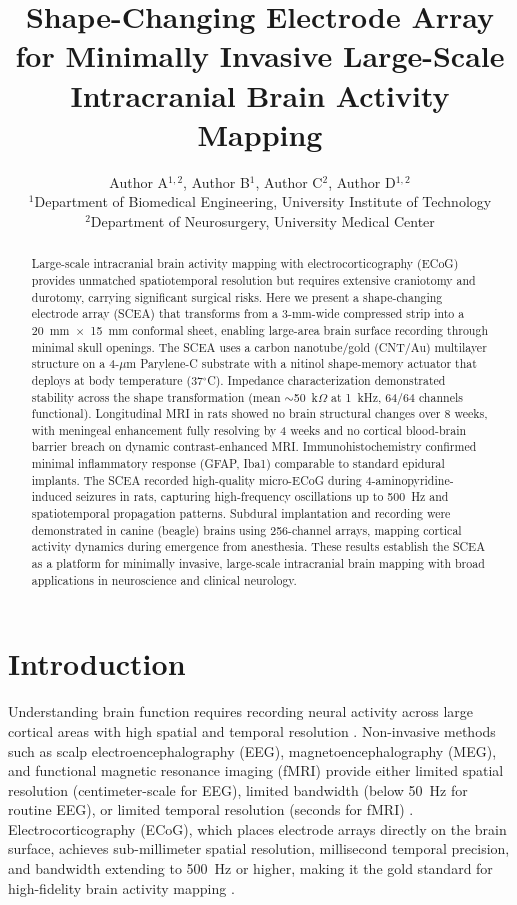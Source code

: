 \documentclass[11pt]{article}
\title{Shape-Changing Electrode Array for Minimally Invasive Large-Scale Intracranial Brain Activity Mapping}
\author{Author A$^{1,2}$, Author B$^{1}$, Author C$^{2}$, Author D$^{1,2}$ \\
\small $^{1}$Department of Biomedical Engineering, University Institute of Technology \\
\small $^{2}$Department of Neurosurgery, University Medical Center}
\date{}
\begin{document}
\maketitle

\begin{abstract}
Large-scale intracranial brain activity mapping with electrocorticography (ECoG) provides unmatched spatiotemporal resolution but requires extensive craniotomy and durotomy, carrying significant surgical risks. Here we present a shape-changing electrode array (SCEA) that transforms from a 3-mm-wide compressed strip into a 20~mm~$\times$~15~mm conformal sheet, enabling large-area brain surface recording through minimal skull openings. The SCEA uses a carbon nanotube/gold (CNT/Au) multilayer structure on a 4-$\mu$m Parylene-C substrate with a nitinol shape-memory actuator that deploys at body temperature (37$^{\circ}$C). Impedance characterization demonstrated stability across the shape transformation (mean $\sim$50~k$\Omega$ at 1~kHz, 64/64 channels functional). Longitudinal MRI in rats showed no brain structural changes over 8 weeks, with meningeal enhancement fully resolving by 4 weeks and no cortical blood-brain barrier breach on dynamic contrast-enhanced MRI. Immunohistochemistry confirmed minimal inflammatory response (GFAP, Iba1) comparable to standard epidural implants. The SCEA recorded high-quality micro-ECoG during 4-aminopyridine-induced seizures in rats, capturing high-frequency oscillations up to 500~Hz and spatiotemporal propagation patterns. Subdural implantation and recording were demonstrated in canine (beagle) brains using 256-channel arrays, mapping cortical activity dynamics during emergence from anesthesia. These results establish the SCEA as a platform for minimally invasive, large-scale intracranial brain mapping with broad applications in neuroscience and clinical neurology.
\end{abstract}

\section{Introduction}

Understanding brain function requires recording neural activity across large cortical areas with high spatial and temporal resolution \citep{buzsaki2012origin, brain_mapping_review2019}. Non-invasive methods such as scalp electroencephalography (EEG), magnetoencephalography (MEG), and functional magnetic resonance imaging (fMRI) provide either limited spatial resolution (centimeter-scale for EEG), limited bandwidth (below 50~Hz for routine EEG), or limited temporal resolution (seconds for fMRI) \citep{eeg_limitations2017, fmri_temporal2012}. Electrocorticography (ECoG), which places electrode arrays directly on the brain surface, achieves sub-millimeter spatial resolution, millisecond temporal precision, and bandwidth extending to 500~Hz or higher, making it the gold standard for high-fidelity brain activity mapping \citep{viventi2011flexible, khodagholy2015neurogrid}.
\end{document}
